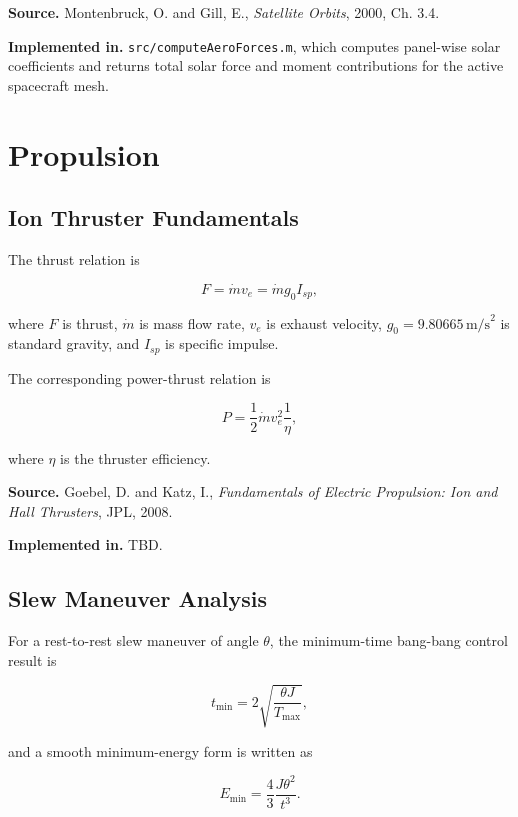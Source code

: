 \documentclass[11pt]{article}
\begin{document}
\textbf{Source.} Montenbruck, O. and Gill, E., \emph{Satellite Orbits},
2000, Ch. 3.4.

\textbf{Implemented in.} \texttt{src/computeAeroForces.m}, which computes
panel-wise solar coefficients and returns total solar force and moment
contributions for the active spacecraft mesh.

\section{Propulsion}

\subsection{Ion Thruster Fundamentals}

The thrust relation is

\begin{equation}
F = \dot{m} v_e = \dot{m} g_0 I_{sp},
\end{equation}

where $F$ is thrust, $\dot{m}$ is mass flow rate, $v_e$ is exhaust
velocity, $g_0 = 9.80665\,\mathrm{m/s}^2$ is standard gravity, and
$I_{sp}$ is specific impulse.

The corresponding power-thrust relation is

\begin{equation}
P = \frac{1}{2} \dot{m} v_e^2 \frac{1}{\eta},
\end{equation}

where $\eta$ is the thruster efficiency.

\textbf{Source.} Goebel, D. and Katz, I., \emph{Fundamentals of Electric
Propulsion: Ion and Hall Thrusters}, JPL, 2008.

\textbf{Implemented in.} TBD.

\subsection{Slew Maneuver Analysis}

For a rest-to-rest slew maneuver of angle $\theta$, the minimum-time
bang-bang control result is

\begin{equation}
t_{\min} = 2\sqrt{\frac{\theta J}{T_{\max}}},
\end{equation}

and a smooth minimum-energy form is written as

\begin{equation}
E_{\min} = \frac{4}{3} \frac{J\theta^2}{t^3}.
\end{equation}
\end{document}
